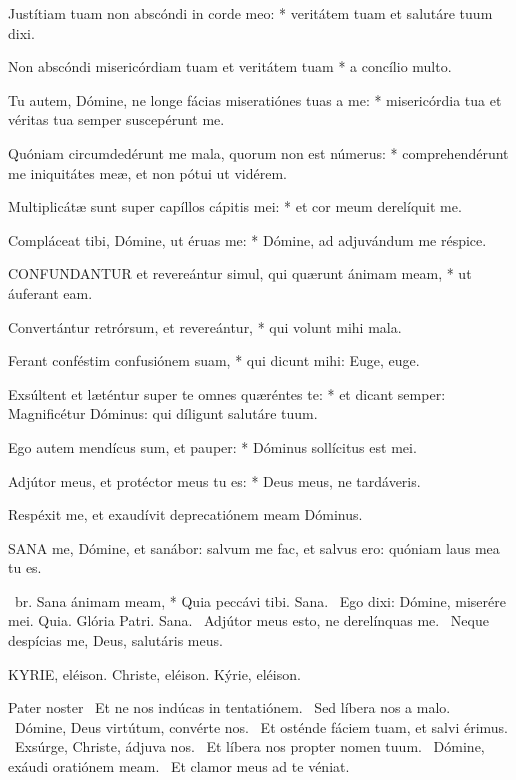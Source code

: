 Justítiam tuam non abscóndi in corde meo: * veritátem tuam et salutáre tuum dixi.

Non abscóndi misericórdiam tuam et veritátem tuam * a concílio multo.

Tu autem, Dómine, ne longe fácias miseratiónes tuas a me: * misericórdia tua et véritas tua semper suscepérunt me.

Quóniam circumdedérunt me mala, quorum non est númerus: * comprehendérunt me iniquitátes meæ, et non pótui ut vidérem.

Multiplicátæ sunt super capíllos cápitis mei: * et cor meum derelíquit me.

Compláceat tibi, Dómine, ut éruas me: * Dómine, ad adjuvándum me réspice.


\lettrine[lines=2]{C}{ONFUNDANTUR} et revereántur simul, qui quærunt ánimam meam, * ut áuferant eam.

Convertántur retrórsum, et revereántur, * qui volunt mihi mala.

Ferant conféstim confusiónem suam, * qui dicunt mihi: Euge, euge.

Exsúltent et læténtur super te omnes quæréntes te: * et dicant semper: Magnificétur Dóminus: qui díligunt salutáre tuum.

Ego autem mendícus sum, et pauper: * Dóminus sollícitus est mei.

Adjútor meus, et protéctor meus tu es: * Deus meus, ne tardáveris.

 Respéxit me, et exaudívit deprecatiónem meam Dóminus.



\lettrine[lines=2]{S}{ANA} me, Dómine, et sanábor: salvum me fac, et salvus ero: quóniam laus mea tu es.

\R\ br. Sana ánimam meam, * Quia peccávi tibi. Sana. \V\ Ego dixi: Dómine, miserére mei. Quia. Glória Patri. Sana. \V\ Adjútor meus esto, ne derelínquas me. \R\ Neque despícias me, Deus, salutáris meus.



KYRIE, eléison. Christe, eléison. Kýrie, eléison.

Pater noster  \V\ Et ne nos indúcas in tentatiónem. \R\ Sed líbera nos a malo. \V\ Dómine, Deus virtútum, convérte nos. \R\ Et osténde fáciem tuam, et salvi érimus. \V\ Exsúrge, Christe, ádjuva nos. \R\ Et líbera nos propter nomen tuum. \V\ Dómine, exáudi oratiónem meam. \R\ Et clamor meus ad te véniat.

